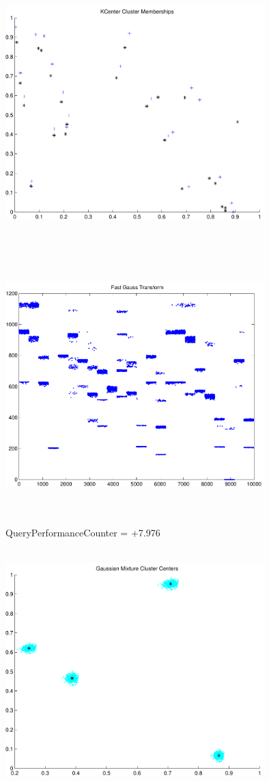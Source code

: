 \documentclass[9pt]{article}
\theoremstyle{plain}
\theoremstyle{definition}
\theoremstyle{remark}
\numberwithin{equation}{section}
\begin{document}
\includegraphics[width=10.0cm,height=10.0cm]{KCenterClusterMemberships_24_Centers.pdf}

\includegraphics[width=10.0cm,height=10.0cm]{FGT24_Centers.pdf}

QueryPerformanceCounter  =  +7.976
\includegraphics[width=10.0cm,height=10.0cm]{GaussianMixture_ClusterCenters4_Centers.pdf}
\end{document}
